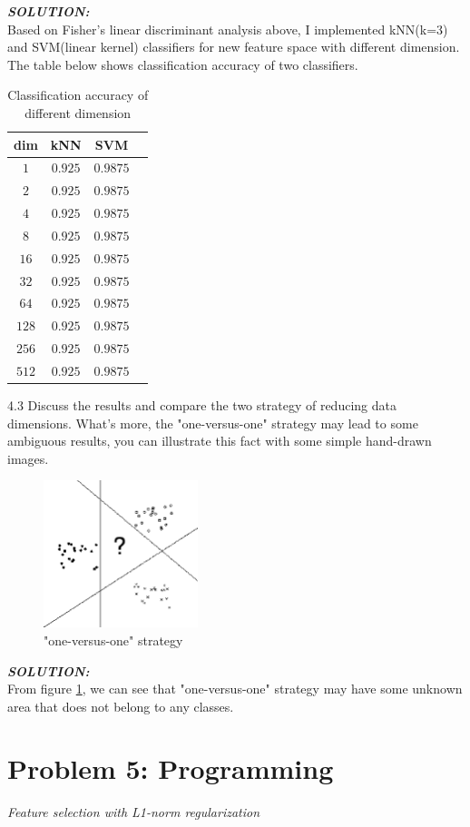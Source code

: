 \documentclass{article}
\theoremstyle{definition}
\theoremstyle{definition}
\theoremstyle{remark}
\begin{document}
\emph{\textbf{SOLUTION:}}\\
Based on Fisher's linear discriminant analysis above, I implemented kNN(k=3) and SVM(linear kernel) classifiers for new feature space with different dimension. The table below shows classification accuracy of two classifiers.
\begin{table}[!htbp]
\centering
\begin{tabular}{|c|c|c|c|}
\hline
 dim & kNN & SVM  \\
\hline
 $1$ & $0.925$ & $0.9875$  \\
\hline
 $2$ & $0.925$ & $0.9875$  \\
\hline
$4$&$ 0.925 $& $0.9875$  \\
\hline
$8$ & $0.925$ & $0.9875$  \\
\hline
$16$ & $0.925$ & $0.9875$ \\
\hline
$32$ & $0.925$ & $0.9875$\\
\hline
$64$ & $0.925$ & $0.9875$\\
\hline
$128$ & $0.925$ & $0.9875$\\
\hline
$256$ & $0.925$ & $0.9875$\\
\hline
$512$ & $0.925$ & $0.9875$\\
\hline
\end{tabular}
\caption{Classification accuracy of different dimension}
\end{table}

4.3 Discuss the results and compare the two strategy of reducing data dimensions. What's more, the "one-versus-one" strategy may lead to some ambiguous results, you can illustrate this fact with some simple hand-drawn images.
\begin{figure}
\centering
\includegraphics[width=4.5cm]{ovo.eps}
\caption{"one-versus-one" strategy}
\label{fig:fig}
\end{figure}
\emph{\textbf{SOLUTION:}}\\
From figure \ref{fig:fig}, we can see that "one-versus-one" strategy may have some unknown area that does not belong to any classes.
\section*{Problem 5: Programming}
\emph{Feature selection with L1-norm regularization}
\end{document}
